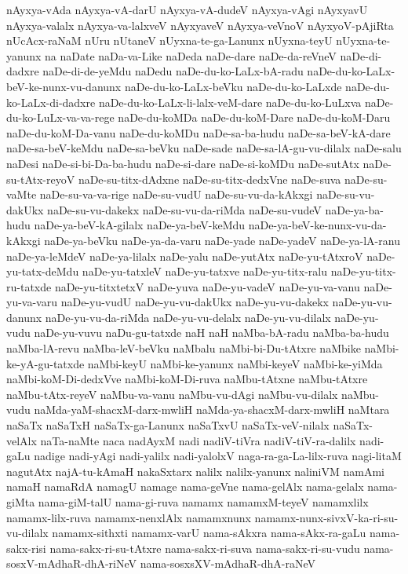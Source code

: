 {nAyxya-vAda
nAyxya-vA-darU
nAyxya-vA-dudeV
nAyxya-vAgi
nAyxyavU
nAyxya-valalx
nAyxya-va-lalxveV
nAyxyaveV
nAyxya-veVnoV
nAyxyoV-pAjiRta
nUcAcx-raNaM
nUru
nUtaneV
nUyxna-te-ga-Lanunx
nUyxna-teyU
nUyxna-te-yanunx
na
naDate
naDa-va-Like
naDeda
naDe-dare
naDe-da-reVneV
naDe-di-dadxre
naDe-di-de-yeMdu
naDedu
naDe-du-ko-LaLx-bA-radu
naDe-du-ko-LaLx-beV-ke-nunx-vu-danunx
naDe-du-ko-LaLx-beVku
naDe-du-ko-LaLxde
naDe-du-ko-LaLx-di-dadxre
naDe-du-ko-LaLx-li-lalx-veM-dare
naDe-du-ko-LuLxva
naDe-du-ko-LuLx-va-va-rege
naDe-du-koMDa
naDe-du-koM-Dare
naDe-du-koM-Daru
naDe-du-koM-Da-vanu
naDe-du-koMDu
naDe-sa-ba-hudu
naDe-sa-beV-kA-dare
naDe-sa-beV-keMdu
naDe-sa-beVku
naDe-sade
naDe-sa-lA-gu-vu-dilalx
naDe-salu
naDesi
naDe-si-bi-Da-ba-hudu
naDe-si-dare
naDe-si-koMDu
naDe-sutAtx
naDe-su-tAtx-reyoV
naDe-su-titx-dAdxne
naDe-su-titx-dedxVne
naDe-suva
naDe-su-vaMte
naDe-su-va-va-rige
naDe-su-vudU
naDe-su-vu-da-kAkxgi
naDe-su-vu-dakUkx
naDe-su-vu-dakekx
naDe-su-vu-da-riMda
naDe-su-vudeV
naDe-ya-ba-hudu
naDe-ya-beV-kA-gilalx
naDe-ya-beV-keMdu
naDe-ya-beV-ke-nunx-vu-da-kAkxgi
naDe-ya-beVku
naDe-ya-da-varu
naDe-yade
naDe-yadeV
naDe-ya-lA-ranu
naDe-ya-leMdeV
naDe-ya-lilalx
naDe-yalu
naDe-yutAtx
naDe-yu-tAtxroV
naDe-yu-tatx-deMdu
naDe-yu-tatxleV
naDe-yu-tatxve
naDe-yu-titx-ralu
naDe-yu-titx-ru-tatxde
naDe-yu-titxtetxV
naDe-yuva
naDe-yu-vadeV
naDe-yu-va-vanu
naDe-yu-va-varu
naDe-yu-vudU
naDe-yu-vu-dakUkx
naDe-yu-vu-dakekx
naDe-yu-vu-danunx
naDe-yu-vu-da-riMda
naDe-yu-vu-delalx
naDe-yu-vu-dilalx
naDe-yu-vudu
naDe-yu-vuvu
naDu-gu-tatxde
naH
naH‌
naMba-bA-radu
naMba-ba-hudu
naMba-lA-revu
naMba-leV-beVku
naMbalu
naMbi-bi-Du-tAtxre
naMbike
naMbi-ke-yA-gu-tatxde
naMbi-keyU
naMbi-ke-yanunx
naMbi-keyeV
naMbi-ke-yiMda
naMbi-koM-Di-dedxVve
naMbi-koM-Di-ruva
naMbu-tAtxne
naMbu-tAtxre
naMbu-tAtx-reyeV
naMbu-va-vanu
naMbu-vu-dAgi
naMbu-vu-dilalx
naMbu-vudu
naMda-yaM-shacxM-darx-mwliH
naMda-ya-shacxM-darx-mwliH
naMtara
naSaTx
naSaTxH
naSaTx-ga-Lanunx
naSaTxvU
naSaTx-veV-nilalx
naSaTx-velAlx
naTa-naMte
naca
nadAyxM
nadi
nadiV-tiVra
nadiV-tiV-ra-dalilx
nadi-gaLu
nadige
nadi-yAgi
nadi-yalilx
nadi-yalolxV
naga-ra-ga-La-lilx-ruva
nagi-litaM
nagutAtx
najA-tu-kAmaH
nakaSxtarx
nalilx
nalilx-yanunx
naliniVM
namAmi
namaH
namaRdA
namagU
namage
nama-geVne
nama-gelAlx
nama-gelalx
nama-giMta
nama-giM-talU
nama-gi-ruva
namamx
namamxM-teyeV
namamxlilx
namamx-lilx-ruva
namamx-nenxlAlx
namamxnunx
namamx-nunx-sivxV-ka-ri-su-vu-dilalx
namamx-sithxti
namamx-varU
nama-sAkxra
nama-sAkx-ra-gaLu
nama-sakx-risi
nama-sakx-ri-su-tAtxre
nama-sakx-ri-suva
nama-sakx-ri-su-vudu
nama-sosxV-mAdhaR-dhA-riNeV
nama-sosxsXV-mAdhaR-dhA-raNeV
}
